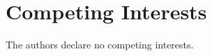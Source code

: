 \documentclass[9pt,lineno]{elife}
\begin{document}
\section{Competing Interests}
The authors declare no competing interests.

\clearpage



\newcommand{\cmark}{\textcolor{green}{\ding{51}}} %
\newcommand{\qmark}{\textcolor{black}{\textbf{\large ?}}} %
\newcommand{\xmark}{\textcolor{red}{\ding{55}}}   %
\newcommand{\bdot}{\Large $\bullet$}

\newcommand{\suppfignum}[2]{\renewcommand{\thefigure}{#1---figure supplement #2}}
\clearpage
\end{document}
